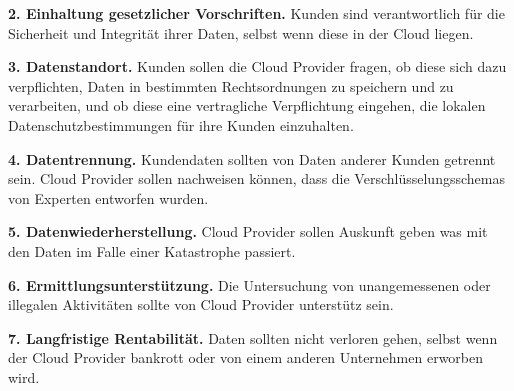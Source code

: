 \textbf{2. Einhaltung gesetzlicher Vorschriften.} Kunden sind verantwortlich für die Sicherheit und Integrität ihrer Daten, selbst wenn diese in der Cloud liegen.

\textbf{3. Datenstandort.} Kunden sollen die Cloud Provider fragen, ob diese sich dazu verpflichten, Daten in bestimmten Rechtsordnungen zu speichern und zu verarbeiten, und ob diese eine vertragliche Verpflichtung eingehen, die lokalen Datenschutzbestimmungen für ihre Kunden einzuhalten.

\textbf{4. Datentrennung.} Kundendaten sollten von Daten anderer Kunden getrennt sein. Cloud Provider sollen nachweisen können, dass die Verschlüsselungsschemas von Experten entworfen wurden.

\textbf{5. Datenwiederherstellung.} Cloud Provider sollen Auskunft geben was mit den Daten im Falle einer Katastrophe passiert.

\textbf{6. Ermittlungsunterstützung.} Die Untersuchung von unangemessenen oder illegalen Aktivitäten sollte von Cloud Provider unterstütz sein. 

\textbf{7. Langfristige Rentabilität.} Daten sollten nicht verloren gehen, selbst wenn der Cloud Provider bankrott oder von einem anderen Unternehmen erworben wird.


